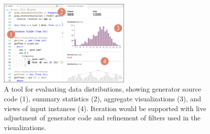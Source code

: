 %
\begin{figure}
  \centering
  \vspace*{-2ex}
  \includegraphics[width=0.58\textwidth]{assets/gen-vis.pdf}
  \caption{A tool for evaluating data distributions, showing
  generator source code (1), summary statistics (2),
  aggregate visualizations (3), and views of input instances
  (4). Iteration would be supported with live adjustment of
  generator code and refinement of filters used in the
  visualizations.}\label{fig:gen-vis}
\end{figure}
%
